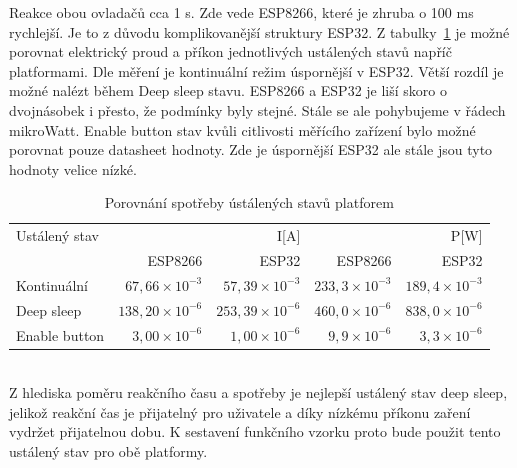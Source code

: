 \documentclass[a4paper, 12pt]{report}
\begin{document}
    Reakce obou ovladačů cca 1 \si{s}.
    Zde vede ESP8266, které je zhruba o 100 \si{ms} rychlejší.
    Je to z důvodu komplikovanější struktury ESP32.
    Z tabulky~\ref{tab:porovnani-klidove-rezimy-spotreba} je možné porovnat elektrický proud a příkon jednotlivých ustálených stavů napříč platformami.
    Dle měření je kontinuální režim úspornější v ESP32.
    Větší rozdíl je možné nalézt během Deep sleep stavu.
    ESP8266 a ESP32 je liší skoro o dvojnásobek i přesto, že podmínky byly stejné.
    Stále se ale pohybujeme v řádech mikroWatt.
    Enable button stav kvůli citlivosti měřícího zařízení bylo možné porovnat pouze datasheet hodnoty.
    Zde je úspornější ESP32 ale stále jsou tyto hodnoty velice nízké.
    \begin{table}[h!]
        \centering
        \caption{Porovnání spotřeby ústálených stavů platforem}
        \begin{tabular}{||l|r r|r r||}
            \hline
            Ustálený stav & \multicolumn{2}{C|}{I[A]} & \multicolumn{2}{C||}{P[W]}   \\
                          & ESP8266        & ESP32   & ESP8266 & ESP32 \\
            \hline
            Kontinuální   & $67,66 \times 10^{-3}$   & $57,39 \times 10^{-3}$ & $233,3 \times 10^{-3}$& $189,4 \times 10^{-3}$ \\
            Deep sleep       & $138,20 \times 10^{-6}$ & $253,39 \times 10^{-6}$ & $460,0 \times 10^{-6}$&$838,0 \times 10^{-6}$\\
            Enable button    &  $3,00 \times 10^{-6}$   & $1,00 \times 10^{-6}$ & $9,9 \times 10^{-6}$&$3,3 \times 10^{-6}$\\
            \hline
        \end{tabular}
        \label{tab:porovnani-klidove-rezimy-spotreba}
    \end{table}\\
    Z hlediska poměru reakčního času a spotřeby je nejlepší ustálený stav deep sleep, jelikož reakční čas je přijatelný pro uživatele a díky nízkému příkonu zaření vydržet přijatelnou dobu.
    K sestavení funkčního vzorku proto bude použit tento ustálený stav pro obě platformy.
\end{document}
